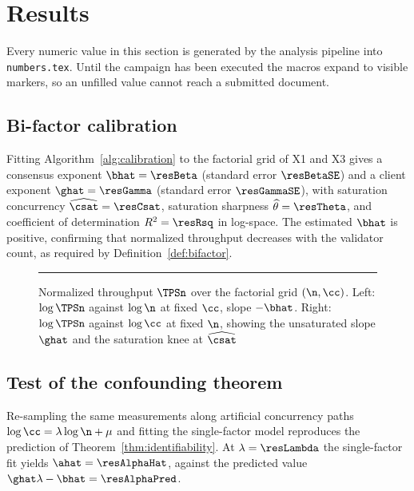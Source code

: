 \section{Results}
\label{sec:results}

\begin{Remark}
Every numeric value in this section is generated by the analysis pipeline into
\texttt{numbers.tex}. Until the campaign has been executed the macros expand to
visible markers, so an unfilled value cannot reach a submitted document.
\end{Remark}

\subsection{Bi-factor calibration}

Fitting Algorithm~\ref{alg:calibration} to the factorial grid of X1 and X3
gives a consensus exponent $\bhat=\resBeta$ (standard error $\resBetaSE$) and a
client exponent $\ghat=\resGamma$ (standard error $\resGammaSE$), with
saturation concurrency $\widehat{\csat}=\resCsat$, saturation sharpness
$\widehat{\theta}=\resTheta$, and coefficient of determination
$R^{2}=\resRsq$ in log-space. The estimated $\bhat$ is positive, confirming
that normalized throughput decreases with the validator count, as required by
Definition~\ref{def:bifactor}.

\begin{figure}[!t]
\centering
\rule{0.9\textwidth}{0.25\textwidth}
\caption{Normalized throughput $\TPSn$ over the factorial grid
$(\n,\cc)$. Left: $\log\TPSn$ against $\log\n$ at fixed $\cc$, slope
$-\bhat$. Right: $\log\TPSn$ against $\log\cc$ at fixed $\n$, showing the
unsaturated slope $\ghat$ and the saturation knee at $\widehat{\csat}$}
\label{fig:bifactor}
\end{figure}

\subsection{Test of the confounding theorem}

Re-sampling the same measurements along artificial concurrency paths
$\log\cc=\lambda\log\n+\mu$ and fitting the single-factor model reproduces the
prediction of Theorem~\ref{thm:identifiability}. At $\lambda=\resLambda$ the
single-factor fit yields $\ahat=\resAlphaHat$, against the predicted value
$\ghat\lambda-\bhat=\resAlphaPred$.

